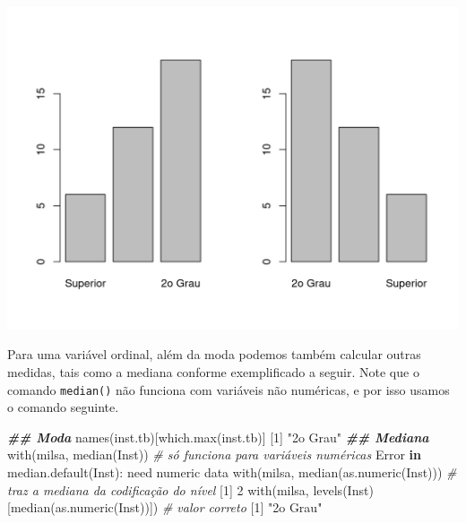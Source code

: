 \documentclass[
  10pt,
  a4paper]{book}
\newenvironment{Shaded}{\begin{snugshade}}{\end{snugshade}}
\newcommand{\CommentTok}[1]{\textcolor[rgb]{0.56,0.35,0.01}{\textit{#1}}}
\newcommand{\ControlFlowTok}[1]{\textcolor[rgb]{0.13,0.29,0.53}{\textbf{#1}}}
\newcommand{\DecValTok}[1]{\textcolor[rgb]{0.00,0.00,0.81}{#1}}
\newcommand{\DocumentationTok}[1]{\textcolor[rgb]{0.56,0.35,0.01}{\textbf{\textit{#1}}}}
\newcommand{\FunctionTok}[1]{\textcolor[rgb]{0.00,0.00,0.00}{#1}}
\newcommand{\NormalTok}[1]{#1}
\newcommand{\SpecialCharTok}[1]{\textcolor[rgb]{0.00,0.00,0.00}{#1}}
\newcommand{\StringTok}[1]{\textcolor[rgb]{0.31,0.60,0.02}{#1}}
\begin{document}
\begin{center}\includegraphics{figures/unnamed-chunk-299-1} \end{center}

Para uma variável ordinal, além da moda podemos também calcular outras
medidas, tais como a mediana conforme exemplificado a seguir. Note que
o comando \texttt{median()} não funciona com variáveis não numéricas, e por
isso usamos o comando seguinte.

\begin{Shaded}
\begin{Highlighting}[]
\DocumentationTok{\#\# Moda}
\FunctionTok{names}\NormalTok{(inst.tb)[}\FunctionTok{which.max}\NormalTok{(inst.tb)]}
\NormalTok{[}\DecValTok{1}\NormalTok{] }\StringTok{"2o Grau"}
\DocumentationTok{\#\# Mediana}
\FunctionTok{with}\NormalTok{(milsa, }\FunctionTok{median}\NormalTok{(Inst))             }\CommentTok{\# só funciona para variáveis numéricas}
\NormalTok{Error }\ControlFlowTok{in} \FunctionTok{median.default}\NormalTok{(Inst)}\SpecialCharTok{:}\NormalTok{ need numeric data}
\FunctionTok{with}\NormalTok{(milsa, }\FunctionTok{median}\NormalTok{(}\FunctionTok{as.numeric}\NormalTok{(Inst))) }\CommentTok{\# traz a mediana da codificação do nível}
\NormalTok{[}\DecValTok{1}\NormalTok{] }\DecValTok{2}
\FunctionTok{with}\NormalTok{(milsa, }\FunctionTok{levels}\NormalTok{(Inst)[}\FunctionTok{median}\NormalTok{(}\FunctionTok{as.numeric}\NormalTok{(Inst))]) }\CommentTok{\# valor correto}
\NormalTok{[}\DecValTok{1}\NormalTok{] }\StringTok{"2o Grau"}
\end{Highlighting}
\end{Shaded}
\end{document}
